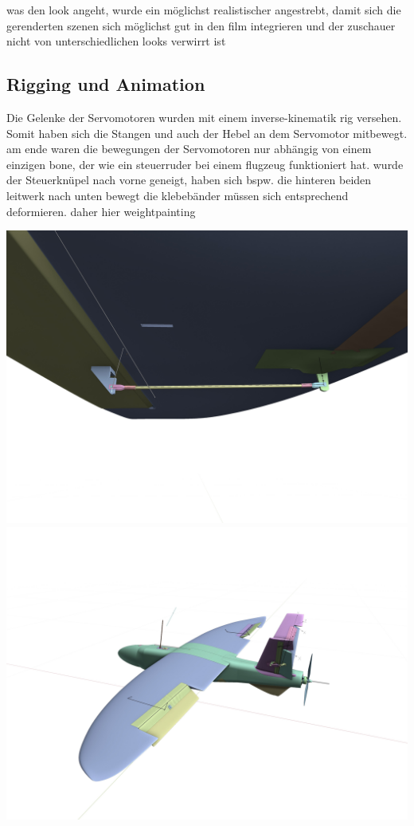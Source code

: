 was den look angeht, wurde ein möglichst realistischer angestrebt, damit sich die gerenderten szenen sich möglichst gut in den film integrieren und der zuschauer nicht von unterschiedlichen looks verwirrt ist

\subsection{Rigging und Animation}

Die Gelenke der Servomotoren wurden mit einem inverse-kinematik rig versehen. Somit haben sich die Stangen und auch der Hebel an dem Servomotor mitbewegt.
am ende waren die bewegungen der Servomotoren nur abhängig von einem einzigen bone, der wie ein steuerruder bei einem flugzeug funktioniert hat.
wurde der Steuerknüpel nach vorne geneigt, haben sich bspw. die hinteren beiden  leitwerk nach unten bewegt
die klebebänder müssen sich entsprechend deformieren.
daher hier weightpainting


\includegraphics[width=\textwidth]{gfx/prod/plane/plane7.jpg}
\includegraphics[width=\textwidth]{gfx/prod/plane/plane8.jpg}

